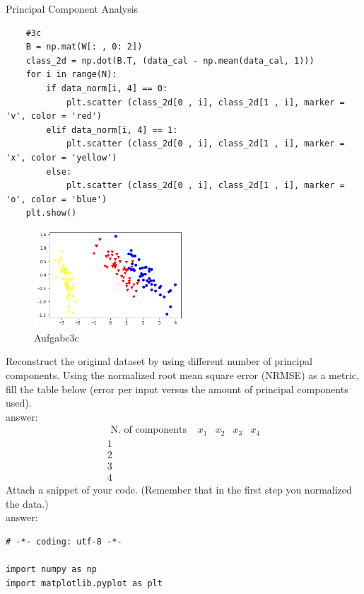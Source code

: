 \documentclass[
	ngerman,
     solution=true
	]{tudaexercise}
\begin{document}
\begin{task}{Principal Component Analysis}
\begin{subtask}[3c)]
\begin{lstlisting}
    #3c
    B = np.mat(W[: , 0: 2]) 
    class_2d = np.dot(B.T, (data_cal - np.mean(data_cal, 1)))
    for i in range(N):
        if data_norm[i, 4] == 0:
            plt.scatter (class_2d[0 , i], class_2d[1 , i], marker = 'v', color = 'red')
        elif data_norm[i, 4] == 1:
            plt.scatter (class_2d[0 , i], class_2d[1 , i], marker = 'x', color = 'yellow')
        else:
            plt.scatter (class_2d[0 , i], class_2d[1 , i], marker = 'o', color = 'blue')
    plt.show()
\end{lstlisting}
\begin{figure}[H] 
\centering 
\includegraphics[width=0.5\textwidth]{Aufgabe3_c.png} 
\caption{Aufgabe3c} 
\label{Fig.main3}
\end{figure}
\end{subtask}
\begin{subtask}[3d)]
Reconstruct the original dataset by using different number of principal components. Using the normalized root mean
square error (NRMSE) as a metric, fill the table below (error per input versus the amount of principal components used).\\[15pt]
answer:\\[15pt]
\[
\begin{array}{c|c|c|c|c}
\text { N. of components } & x_{1} & x_{2} & x_{3} & x_{4} \\
\hline 1 & & & & \\
2 & & & & \\
3 & & & & \\
4 & & & &
\end{array}
\]
Attach a snippet of your code. (Remember that in the first step you normalized the data.)\\[15pt]
answer:\\[15pt]
\begin{lstlisting}
# -*- coding: utf-8 -*-

import numpy as np
import matplotlib.pyplot as plt


\end{lstlisting}
\end{subtask}
\end{task}
\end{document}

